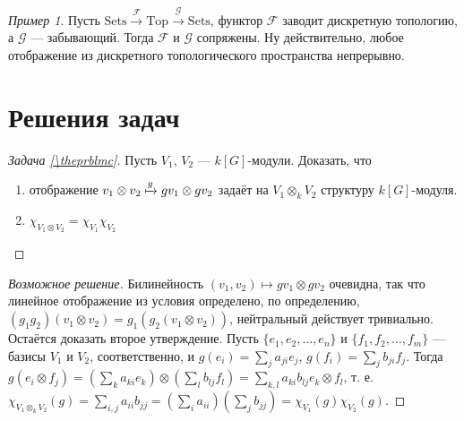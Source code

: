 \documentclass{article}
\theoremstyle{definition}
\theoremstyle{remark}
\newtheorem*{example}{Пример}
\newenvironment{solution}
{\begin{proof}[Возможное решение]}
{\end{proof}}
\newcounter{prblmc}
\newenvironment{prblm}
{\renewcommand{\qedsymbol}{}\begin{proof}[Задача \rm{\ref{\theprblmc}}]}
{\stepcounter{prblmc} \end{proof}}
\newcommand{\F}{\mathscr{F}}
\newcommand{\G}{\mathscr{G}}
\begin{document}
\begin{example}
Пусть $\mathrm{Sets} \xrightarrow{\F} \mathrm{Top} \xrightarrow{\G} \mathrm{Sets}$, функтор $\F$ заводит дискретную топологию, а $\G$ --- забывающий. Тогда $\F$ и $\G$ сопряжены. Ну действительно, любое отображение из дискретного топологического пространства непрерывно.
\end{example}

\section*{Решения задач}

\begin{prblm}
Пусть $V_1$, $V_2$ --- $k[G]$-модули. Доказать, что
\begin{enumerate}

	\item отображение $v_1 \otimes v_2 \xmapsto{g} gv_1 \otimes gv_2$ задаёт на $V_1 \otimes_k V_2$ структуру $k[G]$-модуля.
	\item $\chi_{V_1 \otimes V_2} = \chi_{V_1} \chi_{V_2}$
\end{enumerate}
\end{prblm}
\begin{solution}
	Билинейность $(v_1, v_2) \mapsto gv_1 \otimes gv_2$ очевидна, так что линейное отображение из условия определено, по определению, $(g_1g_2)(v_1 \otimes v_2) = g_1(g_2(v_1 \otimes v_2))$, нейтральный действует тривиально. Остаётся доказать второе утверждение. Пусть $\{e_1, e_2, \ldots, e_n\}$ и $\{f_1, f_2, \ldots, f_m\}$ --- базисы $V_1$ и $V_2$, соответственно, и $g(e_i) = \sum_j a_{ji}e_j$, $g(f_i) = \sum_j b_{ji}f_j$. Тогда $g(e_i \otimes f_j) = (\sum_k a_{ki}e_k) \otimes (\sum_l b_{lj} f_l) = \sum_{k, l} a_{ki}b_{lj} e_k \otimes f_l$, т. е. $\chi_{V_1 \otimes_k V_2}(g) = \sum_{i, j} a_{ii} b_{jj} = (\sum_i a_{ii}) (\sum_j b_{jj}) = \chi_{V_1}(g) \chi_{V_2}(g)$.
\end{solution}
\end{document}
